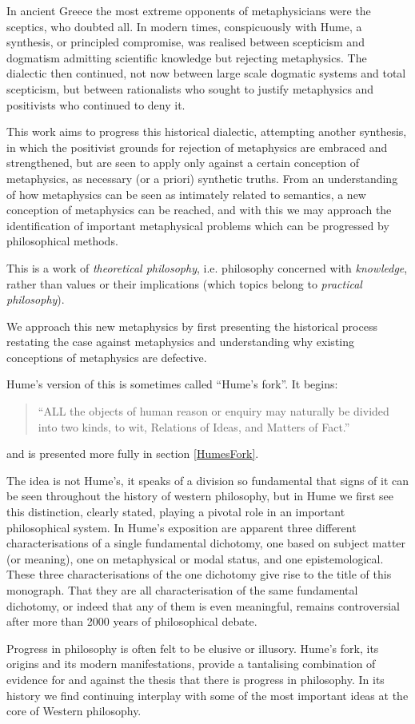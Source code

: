 In ancient Greece the most extreme opponents of metaphysicians were the sceptics, who doubted all.
In modern times, conspicuously with Hume, a synthesis, or principled compromise, was realised between scepticism and dogmatism admitting scientific knowledge but rejecting metaphysics.
The dialectic then continued, not now between large scale dogmatic systems and total scepticism, but between rationalists who sought to justify metaphysics and positivists who continued to deny it.

This work aims to progress this historical dialectic, attempting another synthesis, in which the positivist grounds for rejection of metaphysics are embraced and strengthened, but are seen to apply only against a certain conception of metaphysics, as necessary (or a priori) synthetic truths.
From an understanding of how metaphysics can be seen as intimately related to semantics, a new conception of metaphysics can be reached, and with this we may approach the identification of important metaphysical problems  which can be progressed by philosophical methods.

This is a work of {\it theoretical philosophy}, i.e. philosophy concerned with {\it knowledge}, rather than values or their implications (which topics belong to {\it practical philosophy}).

We approach this new metaphysics by first presenting the historical process restating the case against metaphysics and understanding why existing conceptions of metaphysics are defective.

Hume's version of this is sometimes called ``Hume's fork''.
It begins:

\begin{quote}
``ALL the objects of human reason or enquiry may naturally be divided into two kinds, to wit, Relations of Ideas, and Matters of Fact.''
\end{quote}

and is presented more fully in section \ref{HumesFork}.

The idea is not Hume's, it speaks of a division so fundamental that signs of it can be seen throughout the history of western philosophy, but in Hume we first see this distinction, clearly stated, playing a pivotal role in an important philosophical system.
In Hume's exposition are apparent three different characterisations of a single fundamental dichotomy, one based on subject matter (or meaning), one on metaphysical or modal status, and one epistemological.
These three characterisations of the one dichotomy give rise to the title of this monograph.
That they are all characterisation of the same fundamental dichotomy, or indeed that any of them is even meaningful, remains controversial after more than 2000 years of philosophical debate. 

Progress in philosophy is often felt to be elusive or illusory.
Hume's fork, its origins and its modern manifestations, provide a tantalising combination of evidence for and against the thesis that there is progress in philosophy.
In its history we find continuing interplay with some of the most important ideas at the core of Western philosophy.
